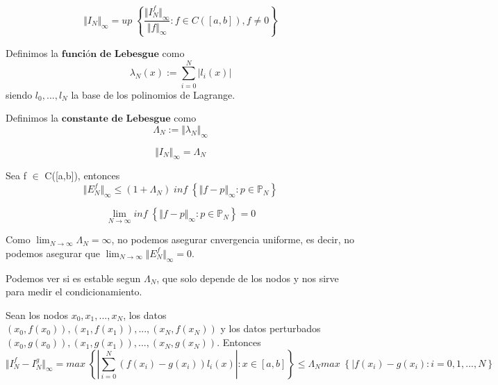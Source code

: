 \begin{nprop}
\[ \Vert I_N \Vert _\infty = up \; \left\lbrace \frac{\Vert I_N^f \Vert _\infty}{\Vert f \Vert _\infty} : f \in C( \left[ a,b \right] ), f \neq 0 \right\rbrace \]
\end{nprop}

\begin{ndef}
Definimos la $\textbf{función de Lebesgue}$ como
\[ \lambda _N(x) := \sum_{i=0}^N \vert l_i(x) \vert \]
siendo {$l_0,...,l_N$} la base de los polinomios de Lagrange.
\end{ndef}

\begin{ndef}
Definimos la $\textbf{constante de Lebesgue}$ como
\[ \Lambda _N := \Vert \lambda _N \Vert _\infty \]
\end{ndef}

\begin{nprop}
\[ \Vert I_N \Vert _\infty = \Lambda _N \]
\end{nprop}

\begin{ncor}
Sea f $\in$ C([a,b]), entonces
\[ \Vert E_N^f \Vert _\infty \leq (1+\Lambda _N) \; inf \; \left\lbrace \Vert f-p \Vert _\infty : p \in \mathbb{P} _N \right\rbrace \]
\end{ncor}

\begin{nth}
\[ \lim_{N\rightarrow \infty} inf \; \left\lbrace \Vert f-p \Vert _\infty : p \in \mathbb{P} _N \right\rbrace = 0 \]
\end{nth}

Como $\lim _{N\rightarrow \infty} \Lambda _N = \infty$, no podemos asegurar cnvergencia uniforme, es decir, no podemos asegurar que $\lim_{N\rightarrow \infty} \Vert E_N^f \Vert _\infty = 0$.

Podemos ver si es estable segun $\Lambda _N$, que solo depende de los nodos y nos sirve para medir el condicionamiento.

\begin{nprop}
Sean los nodos $x_0,x_1,...,x_N$, los datos $(x_0,f(x_0)), (x_1,f(x_1)),...,(x_N,f(x_N))$ y los datos perturbados $(x_0,g(x_0)),(x_1,g(x_1)),...,(x_N,g(x_N))$. Entonces
\[ \Vert I_N^f - I_N^g \Vert _\infty = max \; \left\lbrace \left\vert \sum_{i=0}^N (f(x_i)-g(x_i))l_i(x) \right\vert : x \in \left[ a,b \right] \right\rbrace \leq \Lambda _N max \; \left\lbrace \vert f(x_i)-g(x_i) : i=0,1,...,N \right\rbrace \]
\end{nprop}

